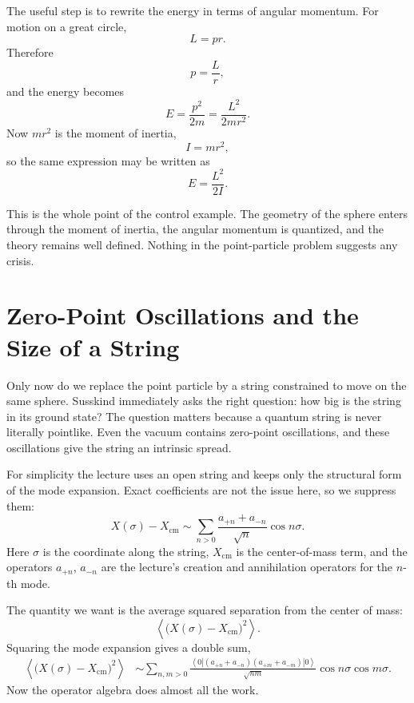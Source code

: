 The useful step is to rewrite the energy in terms of angular momentum. For motion on a great circle,
\begin{equation}
L=pr.
\end{equation}
Therefore
\begin{equation}
p=\frac{L}{r},
\end{equation}
and the energy becomes
\begin{equation}
E=\frac{p^2}{2m}=\frac{L^2}{2mr^2}.
\end{equation}
Now \(mr^2\) is the moment of inertia,
\begin{equation}
I=mr^2,
\end{equation}
so the same expression may be written as
\begin{equation}
E=\frac{L^2}{2I}.
\end{equation}

This is the whole point of the control example. The geometry of the sphere enters through the moment of inertia, the angular momentum is quantized, and the theory remains well defined. Nothing in the point-particle problem suggests any crisis.

\section{Zero-Point Oscillations and the Size of a String}

Only now do we replace the point particle by a string constrained to move on the same sphere. Susskind immediately asks the right question: how big is the string in its ground state? The question matters because a quantum string is never literally pointlike. Even the vacuum contains zero-point oscillations, and these oscillations give the string an intrinsic spread.

For simplicity the lecture uses an open string and keeps only the structural form of the mode expansion. Exact coefficients are not the issue here, so we suppress them:
\begin{equation}
X(\sigma)-X_{\mathrm{cm}}
\sim
\sum_{n>0}\frac{a_{+n}+a_{-n}}{\sqrt{n}}\cos n\sigma.
\end{equation}
Here \(\sigma\) is the coordinate along the string, \(X_{\mathrm{cm}}\) is the center-of-mass term, and the operators \(a_{+n}\), \(a_{-n}\) are the lecture's creation and annihilation operators for the \(n\)-th mode.

The quantity we want is the average squared separation from the center of mass:
\begin{equation}
\left\langle \bigl(X(\sigma)-X_{\mathrm{cm}}\bigr)^2 \right\rangle.
\end{equation}
Squaring the mode expansion gives a double sum,
\begin{align}
\left\langle \bigl(X(\sigma)-X_{\mathrm{cm}}\bigr)^2 \right\rangle
&\sim
\sum_{n,m>0}
\frac{
\left\langle 0 \left|
(a_{+n}+a_{-n})(a_{+m}+a_{-m})
\right|0\right\rangle
}{\sqrt{nm}}
\cos n\sigma \cos m\sigma .
\end{align}
Now the operator algebra does almost all the work.

